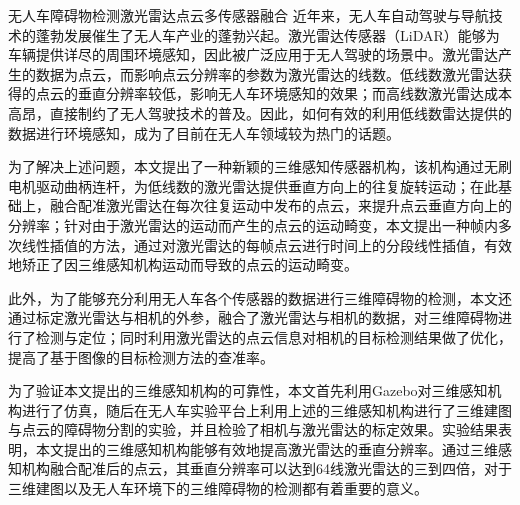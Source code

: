 \begin{Cabstract}{无人车}{障碍物检测}{激光雷达}{点云}{多传感器融合}
近年来，无人车自动驾驶与导航技术的蓬勃发展催生了无人车产业的蓬勃兴起。激光雷达传感器（LiDAR）能够为车辆提供详尽的周围环境感知，因此被广泛应用于无人驾驶的场景中。激光雷达产生的数据为点云，而影响点云分辨率的参数为激光雷达的线数。低线数激光雷达获得的点云的垂直分辨率较低，影响无人车环境感知的效果；而高线数激光雷达成本高昂，直接制约了无人驾驶技术的普及。因此，如何有效的利用低线数雷达提供的数据进行环境感知，成为了目前在无人车领域较为热门的话题。

为了解决上述问题，本文提出了一种新颖的三维感知传感器机构，该机构通过无刷电机驱动曲柄连杆，为低线数的激光雷达提供垂直方向上的往复旋转运动；在此基础上，融合配准激光雷达在每次往复运动中发布的点云，来提升点云垂直方向上的分辨率；针对由于激光雷达的运动而产生的点云的运动畸变，本文提出一种帧内多次线性插值的方法，通过对激光雷达的每帧点云进行时间上的分段线性插值，有效地矫正了因三维感知机构运动而导致的点云的运动畸变。

此外，为了能够充分利用无人车各个传感器的数据进行三维障碍物的检测，本文还通过标定激光雷达与相机的外参，融合了激光雷达与相机的数据，对三维障碍物进行了检测与定位；同时利用激光雷达的点云信息对相机的目标检测结果做了优化，提高了基于图像的目标检测方法的查准率。

为了验证本文提出的三维感知机构的可靠性，本文首先利用Gazebo对三维感知机构进行了仿真，随后在无人车实验平台上利用上述的三维感知机构进行了三维建图与点云的障碍物分割的实验，并且检验了相机与激光雷达的标定效果。实验结果表明，本文提出的三维感知机构能够有效地提高激光雷达的垂直分辨率。通过三维感知机构融合配准后的点云，其垂直分辨率可以达到64线激光雷达的三到四倍，对于三维建图以及无人车环境下的三维障碍物的检测都有着重要的意义。
\end{Cabstract}
